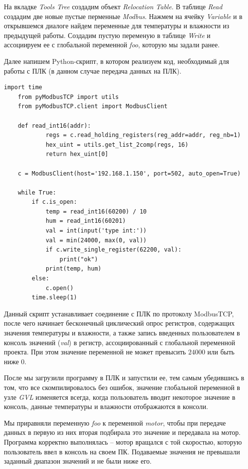 \documentclass[a4paper, 12pt]{article}
\begin{document}
    На вкладке \textit{Tools Tree} создадим объект \textit{Relocation Table}. В таблице \textit{Read} создадим две
    новые пустые перменные \textit{Modbus}. Нажмем на ячейку \textit{Variable} и в открывшемся диалоге найдем переменные для
    температуры и влажности из предыдущей работы. Создадим пустую переменую в таблице \textit{Write} и ассоциируем ее с
    глобальной переменной \textit{foo}, которую мы задали ранее.


    Далее напишем Python-скрипт, в котором реализуем код, необходимый для работы с ПЛК (в данном случае передача данных на ПЛК).
    \begin{lstlisting}[label=code, caption={Python-скрипт для взаимодействия с ПЛК.}]
    import time
    from pyModbusTCP import utils
    from pyModbusTCP.client import ModbusClient
        
    def read_int16(addr):
            regs = c.read_holding_registers(reg_addr=addr, reg_nb=1)
            hex_uint = utils.get_list_2comp(regs, 16)
            return hex_uint[0]
        
    c = ModbusClient(host='192.168.1.150', port=502, auto_open=True)
        
    while True:
        if c.is_open:
            temp = read_int16(60200) / 10
            hum = read_int16(60201)
            val = int(input('type int:'))
            val = min(24000, max(0, val))
            if c.write_single_register(62200, val):
                print("ok")
            print(temp, hum)
        else:
            c.open()
        time.sleep(1)
    \end{lstlisting}

    
    Данный скрипт устанавливает соединение с ПЛК по протоколу
    ModbusTCP, после чего начинает бесконечный циклический опрос
    регистров, содержащих значения температуры и влажности, а также
    запись введенных пользователем в консоль значений (\textit{val}) в регистр,
    ассоциированный с глобальной переменной проекта. При этом значение переменной
    не может превысить $24000$ или быть ниже $0$.


    После мы загрузили программу в ПЛК и запустили ее, тем самым убедившись
    в том, что все скомпилировалось без ошибок, значение глобальной переменной в узле \textit{GVL} изменяется всегда, когда пользователь
    вводит некоторое значение в консоль, данные температуры и влажности отображаются в консоли.


    Мы приравняли переменную \textit{foo} к переменной \textit{motor}, чтобы при передаче данных в первую из них вторая подбирала это значение и передавала на мотор.
    Программа корректно выполнялась -- мотор вращался с той скоростью, которую пользователь ввел в консоль на своем ПК. Подаваемые значения не превышали заданный диапазон значений и не были
    ниже его.
\end{document}
